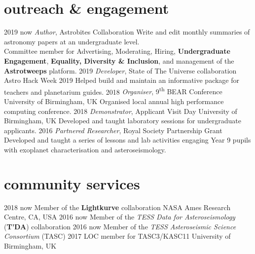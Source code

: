 \documentclass[letterpaper]{k-cv} %
\begin{document}
\section{\color{c3}outreach \& engagement}
\begin{entrylist}
	\centry
	{2019 \to now}
	{\emph{Author}, Astrobites Collaboration}
	{}
	{Write and edit monthly summaries of astronomy papers at an undergraduate level. \\ Committee member for Advertising, Moderating, Hiring, \textbf{\textcolor{c3}{Undergraduate Engagement}},  \textbf{\textcolor{c3}{Equality, Diversity \& Inclusion}}, and management of the \textbf{\textcolor{c3}{Astrotweeps}} platform.}
	\centry
	{2019}
	{\emph{Developer}, State of The Universe collaboration}
	{Astro Hack Week 2019}
	{Helped build and maintain an informative package for teachers and planetarium guides.}
	\centry
	{2018 }
	{\emph{Organiser}, 9\textsuperscript{th} BEAR Conference}
	{University of Birmingham, UK}
	{Organised local annual high performance computing conference.}
	\centry
	{2018 }
	{\emph{Demonstrator}, Applicant Visit Day}
	{University of Birmingham, UK}
	{Developed and taught laboratory sessions for undergraduate applicants.}
	\centry
	{2016 }
	{\emph{Partnered Researcher}, \textcolor{c3}{Royal Society Partnership Grant}}
	{}
	{Developed and taught a series of lessons and lab activities engaging Year 9 pupils with exoplanet characterisation and asteroseismology.}
\end{entrylist}

\section{\color{c4}community services}
\begin{entrylist}
	\centrythree
	{2018 \to now}
	{Member of the \textbf{\textcolor{c4}{Lightkurve}} collaboration}
	{NASA Ames Research Centre, CA, USA}
	\centrythree
	{2016 \to now}
	{Member of the \emph{TESS Data for Asteroseismology} (\textbf{\textcolor{c4}{T'DA}}) collaboration }
	{}
	\centrythree
	{2016 \to now}
	{Member of the \emph{TESS Asteroseismic Science Consortium} (TASC)}
	{}
	\centrythree
	{2017}
	{LOC member for TASC3/KASC11}
	{University of Birmingham, UK}
\end{entrylist}
\end{document}

